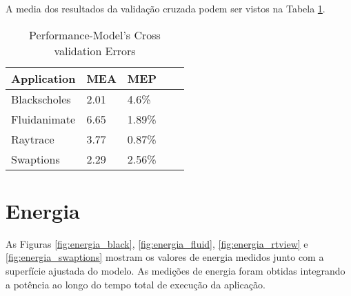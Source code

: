 A media dos  resultados da validação cruzada podem ser vistos na Tabela \ref{tab:svr_evaluation}.

\begin{table}[H]
\centering
\begin{tabular}{|l|l|l|l|l|}
\hline
\hline
Application  & MEA & MEP \\ \hline
Blackscholes & 2.01  & 4.6\% \\ \hline
Fluidanimate & 6.65  & 1.89\% \\ \hline
Raytrace  & 3.77  & 0.87\% \\ \hline
Swaptions & 2.29  & 2.56\% \\ \hline
\end{tabular}
\caption{Performance-Model's Cross validation Errors}
\label{tab:svr_evaluation}
\end{table}


\section{Energia} \label{sec:ajuste_en}

As Figuras \ref{fig:energia_black}, \ref{fig:energia_fluid}, \ref{fig:energia_rtview} e \ref{fig:energia_swaptions} mostram os valores de energia medidos junto com a superfície ajustada do modelo. As medições de energia foram obtidas integrando a potência ao longo do tempo total de execução da aplicação.

